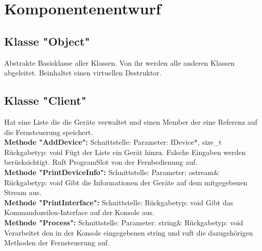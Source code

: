 \documentclass[12pt,a4paper]{article}
\begin{document}
\newpage
\section {Komponentenentwurf}
\subsection {Klasse "Object"}
Abstrakte Basisklasse aller Klassen. Von ihr werden alle anderen Klassen abgeleitet. Beinhaltet einen virtuellen Destruktor.

\subsection {Klasse "Client"}
Hat eine Liste die die Geräte verwaltet und einen Member der eine Referenz auf die Fernsteuerung speichert.
\\

\textbf {Methode "AddDevice": } 
\newline
Schnittstelle:
\newline
Parameter: IDevice*, size\_t
\newline
Rückgabetyp: void
\newline
Fügt der Liste ein Gerät hinzu. Falsche Eingaben werden berücksichtigt. Ruft ProgramSlot von der Fernbedienung auf.
\\

\textbf {Methode "PrintDeviceInfo": } 
\newline
Schnittstelle:
\newline
Parameter: ostream\&
\newline
Rückgabetyp: void
\newline
Gibt die Informationen der Geräte auf dem mitgegebenen Stream aus.
\\

\textbf {Methode "PrintInterface": } 
\newline
Schnittstelle:
\newline
Rückgabetyp: void
\newline
Gibt das Kommandozeilen-Interface auf der Konsole aus.
\\

\textbf {Methode "Process": } 
\newline
Schnittstelle:
\newline
Parameter: string\&
\newline
Rückgabetyp: void
\newline
Verarbeitet den in der Konsole eingegebenen string und ruft die dazugehörigen Methoden der Fernsteuerung auf.
\\
\end{document}
